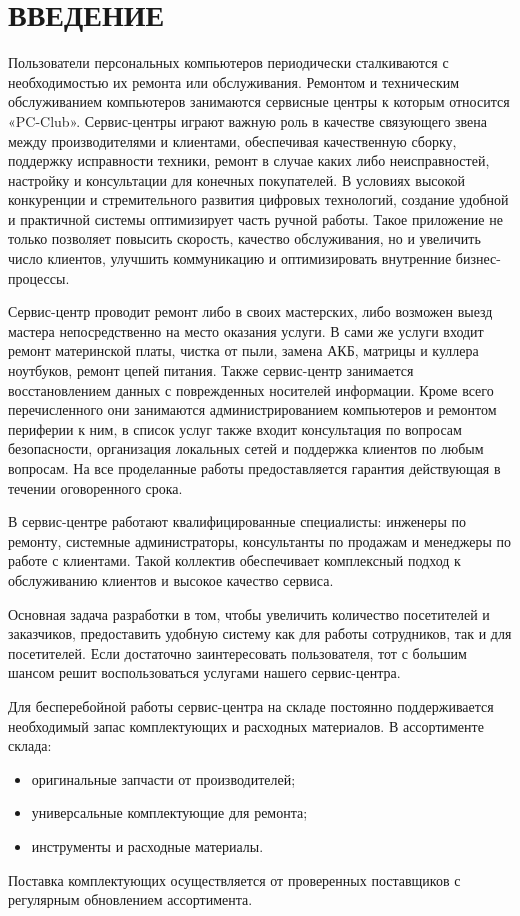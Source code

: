 \section*{ВВЕДЕНИЕ}

Пользователи персональных компьютеров периодически сталкиваются с необходимостью их ремонта или обслуживания. Ремонтом и техническим обслуживанием  компьютеров занимаются сервисные центры к которым относится «PC-Club». Сервис-центры играют важную роль в качестве связующего звена между производителями и клиентами, обеспечивая качественную сборку, поддержку исправности техники, ремонт в случае каких либо неисправностей, настройку и консультации для конечных покупателей. В условиях высокой конкуренции и стремительного развития цифровых технологий, создание удобной и практичной системы оптимизирует часть ручной работы. Такое приложение не только позволяет повысить скорость, качество обслуживания, но и увеличить число клиентов, улучшить коммуникацию и оптимизировать внутренние бизнес-процессы.

Сервис-центр проводит ремонт либо в своих мастерских, либо возможен выезд мастера непосредственно на место оказания услуги. В сами же услуги входит ремонт материнской платы, чистка от пыли, замена АКБ, матрицы и куллера ноутбуков, ремонт цепей питания. Также сервис-центр занимается восстановлением данных с поврежденных носителей информации. Кроме всего перечисленного они занимаются администрированием компьютеров и ремонтом периферии к ним, в список услуг также входит консультация по вопросам безопасности, организация локальных сетей и поддержка клиентов по любым вопросам. На все проделанные работы предоставляется гарантия действующая в течении оговоренного срока.

В сервис-центре работают квалифицированные специалисты: инженеры по ремонту, системные администраторы, консультанты по продажам и менеджеры по работе с клиентами. Такой коллектив обеспечивает комплексный подход к обслуживанию клиентов и высокое качество сервиса.

Основная задача разработки в том, чтобы увеличить количество посетителей и заказчиков, предоставить удобную систему как для работы сотрудников, так и для посетителей. Если достаточно заинтересовать пользователя, тот с большим шансом решит воспользоваться услугами нашего сервис-центра.

Для бесперебойной работы сервис-центра на складе постоянно поддерживается необходимый запас комплектующих и расходных материалов. В ассортименте склада:
\begin{itemize}
\item оригинальные запчасти от производителей;
\item универсальные комплектующие для ремонта;
\item инструменты и расходные материалы.
\end{itemize}
Поставка комплектующих осуществляется от проверенных поставщиков с регулярным обновлением ассортимента. 

